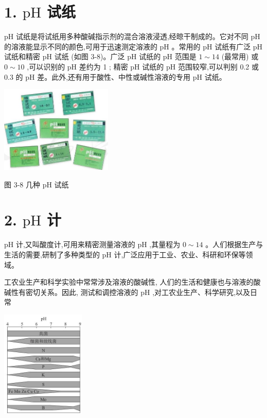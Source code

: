 \documentclass[10pt]{article}
\begin{document}
\section*{1. \(\mathrm{{pH}}\) 试纸}

\(\mathrm{{pH}}\) 试纸是将试纸用多种酸碱指示剂的混合溶液浸透,经晾干制成的。它对不同 \(\mathrm{{pH}}\) 的溶液能显示不同的颜色,可用于迅速测定溶液的 \(\mathrm{{pH}}\) 。常用的 \(\mathrm{{pH}}\) 试纸有广泛 \(\mathrm{{pH}}\) 试纸和精密 \(\mathrm{{pH}}\) 试纸 (如图 3-8)。广泛 \(\mathrm{{pH}}\) 试纸的 \(\mathrm{{pH}}\) 范围是 \(1 \sim {14}\) (最常用) 或 \(0 \sim {10}\) ,可以识别的 \(\mathrm{{pH}}\) 差约为 1 ; 精密 \(\mathrm{{pH}}\) 试纸的 \(\mathrm{{pH}}\) 范围较窄,可以判别 0.2 或 0.3 的 \(\mathrm{{pH}}\) 差。此外,还有用于酸性、中性或碱性溶液的专用 \(\mathrm{{pH}}\) 试纸。

\begin{center}
\includegraphics[max width=0.4\textwidth]{images/0190da9d-8bfd-732f-bc2c-0b21d0f13b91_70_515966.jpg}
\end{center}

图 3-8 几种 \(\mathrm{{pH}}\) 试纸

\section*{2. \(\mathrm{{pH}}\) 计}

\(\mathrm{{pH}}\) 计,又叫酸度计,可用来精密测量溶液的 \(\mathrm{{pH}}\) ,其量程为 \(0 \sim {14}\) 。人们根据生产与生活的需要,研制了多种类型的 \(\mathrm{{pH}}\) 计,广泛应用于工业、农业、科研和环保等领域。

工农业生产和科学实验中常常涉及溶液的酸碱性, 人们的生活和健康也与溶液的酸碱性有密切关系。因此, 测试和调控溶液的 \(\mathrm{{pH}}\) ,对工农业生产、科学研究,以及日常

\begin{center}
\includegraphics[max width=0.3\textwidth]{images/0190da9d-8bfd-732f-bc2c-0b21d0f13b91_71_122044.jpg}
\end{center}
\end{document}
